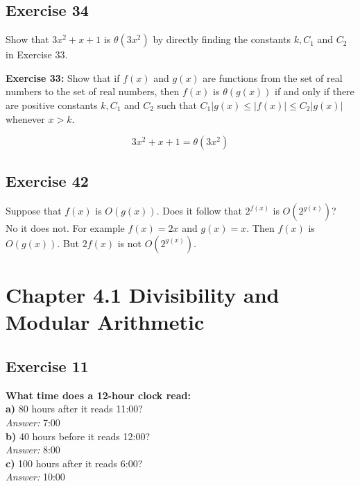 \documentclass[12pt]{article}
\begin{document}
    \subsection{Exercise 34}
    Show that $3x^2+x+1$ is $\theta (3x^2)$ by directly finding the constants $k, C_1$ and $C_2$ in Exercise 33.

    \textbf{Exercise 33:}
    Show that if $f(x)$ and $g(x)$ are functions from the set of real numbers to the set of real numbers, then $f(x)$ is $\theta (g(x))$ if and only if there are positive constants $k, C_1$ and $C_2$ such that $C_1|g(x) \leq |f(x)| \leq C_2|g(x)|$ whenever $x > k$.

    \begin{equation}
        3x^2+x+1 = \theta (3x^2)
    \end{equation}

    \subsection{Exercise 42}
    Suppose that $f(x)$ is $O(g(x))$. Does it follow that $2^{f(x)}$ is $O(2^{g(x)})$?\\
    No it does not. For example $f(x)=2x$ and $g(x)=x$.
    Then $f(x)$ is $O(g(x))$. But $2f(x)$ is not $O(2^{g(x)})$.

    \pagebreak
    \section{Chapter 4.1 Divisibility and Modular Arithmetic}
    \subsection{Exercise 11}
    \textbf{What time does a 12-hour clock read:}\\
    \textbf{a)} 80 hours after it reads 11:00?\\
    \emph{Answer:} 7:00\\
    \textbf{b)} 40 hours before it reads 12:00?\\
    \emph{Answer:} 8:00\\
    \textbf{c)} 100 hours after it reads 6:00?\\
    \emph{Answer:} 10:00
\end{document}
